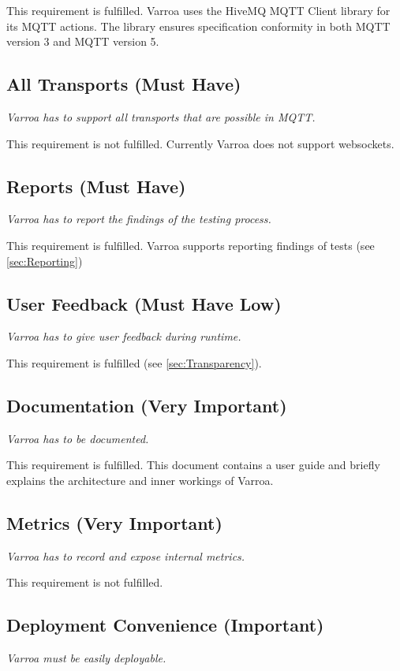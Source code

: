 This requirement is fulfilled.
Varroa uses the HiveMQ MQTT Client library for its MQTT actions.
The library ensures specification conformity in both MQTT version 3 and MQTT version 5.

\subsection{All Transports (Must Have)}
\emph{Varroa has to support all transports that are possible in MQTT.}

This requirement is not fulfilled.
Currently Varroa does not support websockets.

\subsection{Reports (Must Have)}
\emph{Varroa has to report the findings of the testing process.}

This requirement is fulfilled.
Varroa supports reporting findings of tests (see \ref{sec:Reporting})

\subsection{User Feedback (Must Have Low)}
\emph{Varroa has to give user feedback during runtime.}

This requirement is fulfilled (see \ref{sec:Transparency}).

\subsection{Documentation (Very Important)}
\emph{Varroa has to be documented. }

This requirement is fulfilled.
This document contains a user guide and briefly explains the architecture and inner workings of Varroa.

\subsection{Metrics (Very Important)}
\emph{Varroa has to record and expose internal metrics.}

This requirement is not fulfilled.

\subsection{Deployment Convenience (Important)}
\emph{Varroa must be easily deployable.}

